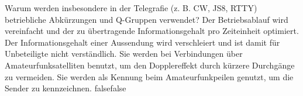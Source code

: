     {Warum werden insbesondere in der Telegrafie (z. B. CW, JS8, RTTY) betriebliche Abkürzungen und Q-Gruppen verwendet?}
    {Der Betriebsablauf wird vereinfacht und der zu übertragende Informationsgehalt pro Zeiteinheit optimiert.}
    {Der Informationsgehalt einer Aussendung wird verschleiert und ist damit für Unbeteiligte nicht verständlich.}
    {Sie werden bei Verbindungen über Amateurfunksatelliten benutzt, um den Dopplereffekt durch kürzere Durchgänge zu vermeiden.}
    {Sie werden als Kennung beim Amateurfunkpeilen genutzt, um die Sender zu kennzeichnen.}
    {false}{false}